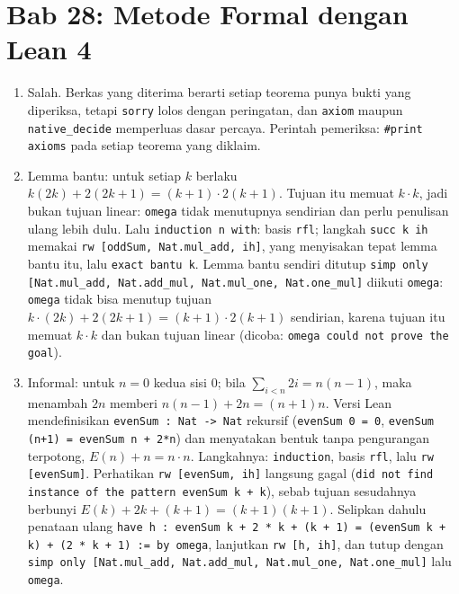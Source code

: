 \section*{Bab 28: Metode Formal dengan Lean 4}
\begin{enumerate}[label=\textbf{28.\arabic*}]
  \item Salah. Berkas yang diterima berarti setiap teorema punya bukti yang
        diperiksa, tetapi \texttt{sorry} lolos dengan peringatan, dan
        \texttt{axiom} maupun \texttt{native\_decide} memperluas dasar percaya.
        Perintah pemeriksa: \texttt{\#print axioms} pada setiap teorema yang
        diklaim.

  \item 
Lemma bantu: untuk setiap $k$ berlaku $k(2k)+2(2k+1)=(k+1)\cdot2(k+1)$.
        Tujuan itu memuat $k\cdot k$, jadi bukan tujuan linear: \texttt{omega} tidak
        menutupnya sendirian dan perlu penulisan ulang lebih dulu. Lalu
        \texttt{induction n with}: basis \texttt{rfl}; langkah \texttt{succ k ih}
        memakai \texttt{rw [oddSum, Nat.mul\_add, ih]}, yang menyisakan tepat lemma
        bantu itu, lalu \texttt{exact bantu k}. Lemma bantu sendiri ditutup
        \texttt{simp only [Nat.mul\_add, Nat.add\_mul, Nat.mul\_one, Nat.one\_mul]}
        diikuti \texttt{omega}: \texttt{omega} tidak bisa menutup tujuan
        $k\cdot(2k)+2(2k+1)=(k+1)\cdot2(k+1)$ sendirian, karena tujuan itu memuat
        $k\cdot k$ dan bukan tujuan linear (dicoba: \texttt{omega could not prove
        the goal}).

  \item Informal: untuk $n=0$ kedua sisi $0$; bila $\sum_{i<n}2i=n(n-1)$, maka
        menambah $2n$ memberi $n(n-1)+2n=(n+1)n$. Versi Lean mendefinisikan
        \texttt{evenSum : Nat -> Nat} rekursif (\texttt{evenSum 0 = 0},
        \texttt{evenSum (n+1) = evenSum n + 2*n}) dan menyatakan bentuk tanpa
        pengurangan terpotong, $E(n)+n=n\cdot n$. Langkahnya: \texttt{induction},
        basis \texttt{rfl}, lalu \texttt{rw [evenSum]}. Perhatikan
        \texttt{rw [evenSum, ih]} langsung gagal (\texttt{did not find instance of
        the pattern evenSum k + k}), sebab tujuan sesudahnya berbunyi
        $E(k)+2k+(k+1)=(k+1)(k+1)$. Selipkan dahulu penataan ulang
        \texttt{have h : evenSum k + 2 * k + (k + 1) = (evenSum k + k) + (2 * k + 1) := by omega},
        lanjutkan \texttt{rw [h, ih]}, dan tutup dengan
        \texttt{simp only [Nat.mul\_add, Nat.add\_mul, Nat.mul\_one, Nat.one\_mul]}
        lalu \texttt{omega}.


\end{enumerate}
